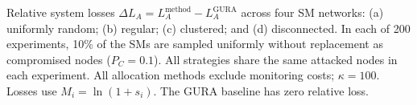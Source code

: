 \caption{Relative system losses $\Delta L_A=L_A^{\mathrm{method}}-L_A^{\mathrm{GURA}}$ across four SM networks: (a) uniformly random; (b) regular; (c) clustered; and (d) disconnected. In each of 200 experiments, 10\% of the SMs are sampled uniformly without replacement as compromised nodes ($P_C=0.1$). All strategies share the same attacked nodes in each experiment. All allocation methods exclude monitoring costs; $\kappa=100$. Losses use $M_i=\ln(1+s_i)$. The GURA baseline has zero relative loss.}
